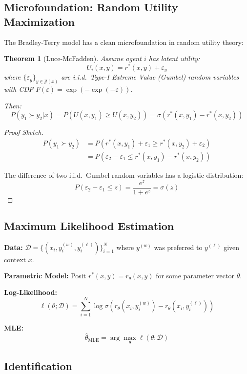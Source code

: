 \documentclass[11pt]{article}
\newcommand{\1}{\mathbf{1}}
\theoremstyle{plain}
\newtheorem{theorem}{Theorem}
\theoremstyle{definition}
\theoremstyle{remark}
\begin{document}
\subsection*{Microfoundation: Random Utility Maximization}

The Bradley-Terry model has a clean microfoundation in random utility theory:

\begin{theorem}[Luce-McFadden]
Assume agent $i$ has latent utility:
$$
U_i(x,y) = r^*(x,y) + \varepsilon_y
$$
where $\{\varepsilon_y\}_{y \in \mathcal{Y}(x)}$ are i.i.d.\ Type-I Extreme Value (Gumbel) random variables with CDF $F(\varepsilon) = \exp(-\exp(-\varepsilon))$.

Then:
$$
P(y_1 \succ y_2 | x) = P(U(x,y_1) \geq U(x,y_2)) = \sigma(r^*(x,y_1) - r^*(x,y_2))
$$
\end{theorem}

\begin{proof}[Proof Sketch]
\begin{align*}
P(y_1 \succ y_2) &= P(r^*(x,y_1) + \varepsilon_1 \geq r^*(x,y_2) + \varepsilon_2) \\
&= P(\varepsilon_2 - \varepsilon_1 \leq r^*(x,y_1) - r^*(x,y_2))
\end{align*}

The difference of two i.i.d.\ Gumbel random variables has a logistic distribution:
$$
P(\varepsilon_2 - \varepsilon_1 \leq z) = \frac{e^z}{1 + e^z} = \sigma(z)
$$
\end{proof}

\subsection*{Maximum Likelihood Estimation}

\textbf{Data:} $\mathcal{D} = \{(x_i, y_i^{(w)}, y_i^{(\ell)})\}_{i=1}^N$ where $y^{(w)}$ was preferred to $y^{(\ell)}$ given context $x$.

\noindent \textbf{Parametric Model:} Posit $r^*(x,y) = r_\theta(x,y)$ for some parameter vector $\theta$.

\noindent \textbf{Log-Likelihood:}
$$
\ell(\theta; \mathcal{D}) = \sum_{i=1}^N \log \sigma(r_\theta(x_i, y_i^{(w)}) - r_\theta(x_i, y_i^{(\ell)}))
$$

\noindent \textbf{MLE:}
$$
\hat{\theta}_{\text{MLE}} = \arg\max_\theta \ell(\theta; \mathcal{D})
$$

\subsection*{Identification}
\end{document}
